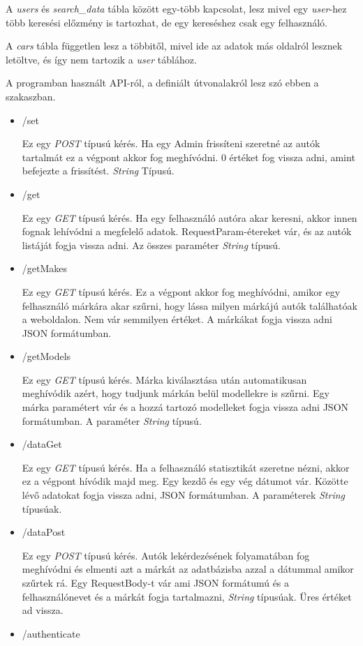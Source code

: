 A \textit{users} és \textit{search\_data} tábla között egy-több kapcsolat, lesz mivel egy \textit{user}-hez több keresési előzmény is tartozhat, de egy kereséshez csak egy felhasználó.

A \textit{cars} tábla független lesz a többitől, mivel ide az adatok más oldalról lesznek letöltve, és így nem tartozik a \textit{user} táblához.

 
A programban használt API-ról, a definiált útvonalakról lesz szó ebben a szakaszban.
\begin{itemize}
\item /set

Ez egy \textit{POST} típusú kérés. Ha egy Admin frissíteni szeretné az autók tartalmát ez a végpont akkor fog meghívódni.
0 értéket fog vissza adni, amint befejezte a frissítést. \textit{String} Típusú.
\item /get

Ez egy \textit{GET} típusú kérés. Ha egy felhasználó autóra akar keresni, akkor innen fognak lehívódni a megfelelő adatok.
RequestParam-étereket vár, és az autók listáját fogja vissza adni. Az összes paraméter \textit{String} típusú.
\item /getMakes

Ez egy \textit{GET} típusú kérés. Ez a végpont akkor fog meghívódni, amikor egy felhasználó márkára akar szűrni, hogy lássa milyen márkájú autók találhatóak a weboldalon.
Nem vár semmilyen értéket. A márkákat fogja vissza adni JSON formátumban.
\item /getModels

Ez egy \textit{GET} típusú kérés. Márka kiválasztása után automatikusan meghívódik azért, hogy tudjunk márkán belül modellekre is szűrni.
Egy márka paramétert vár és a hozzá tartozó modelleket fogja vissza adni JSON  formátumban. A paraméter \textit{String} típusú.
\item /dataGet

Ez egy \textit{GET} típusú kérés. Ha a felhasználó statisztikát szeretne nézni, akkor ez a végpont hívódik majd meg.
Egy kezdő és egy vég dátumot vár. Közötte lévő adatokat fogja vissza adni, JSON formátumban. A paraméterek \textit{String} típusúak.
\item /dataPost

Ez egy \textit{POST} típusú kérés. Autók lekérdezésének folyamatában fog meghívódni és elmenti azt a márkát az adatbázisba azzal a dátummal amikor szűrtek rá.
Egy RequestBody-t vár ami JSON formátumú és a felhasználónevet és a márkát fogja tartalmazni, \textit{String} típusúak. Üres értéket ad vissza.
\item /authenticate


\end{itemize}
